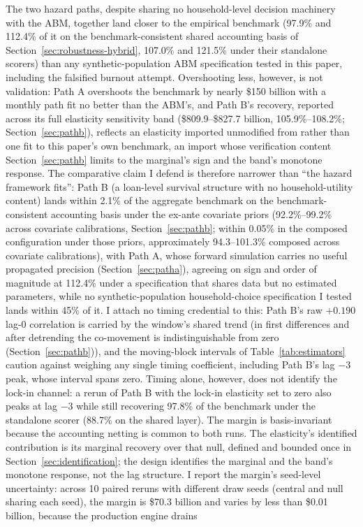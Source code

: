 \documentclass[12pt]{article}
\begin{document}
\begin{table}[H]
\begin{threeparttable}
\begin{tablenotes}[flushleft]
\end{tablenotes}
\end{threeparttable}
\end{table}

The two hazard paths, despite sharing no household-level decision machinery with the ABM, together land closer to the empirical benchmark (97.9\% and 112.4\% of it on the benchmark-consistent shared accounting basis of Section~\ref{sec:robustness-hybrid}, 107.0\% and 121.5\% under their standalone scorers) than any synthetic-population ABM specification tested in this paper, including the falsified burnout attempt. Overshooting less, however, is not validation: Path A overshoots the benchmark by nearly \$150 billion with a monthly path fit no better than the ABM's, and Path B's recovery, reported across its full elasticity sensitivity band (\$809.9--\$827.7 billion, 105.9\%--108.2\%; Section~\ref{sec:pathb}), reflects an elasticity imported unmodified from \citet{liebersohn2024} rather than one fit to this paper's own benchmark, an import whose verification content Section~\ref{sec:pathb} limits to the marginal's sign and the band's monotone response. The comparative claim I defend is therefore narrower than ``the hazard framework fits'': Path B (a loan-level survival structure with no household-utility content) lands within 2.1\% of the aggregate benchmark on the benchmark-consistent accounting basis under the ex-ante covariate priors (92.2\%--99.2\% across covariate calibrations, Section~\ref{sec:pathb}; within 0.05\% in the composed configuration under those priors, approximately 94.3--101.3\% composed across covariate calibrations), with Path A, whose forward simulation carries no useful propagated precision (Section~\ref{sec:patha}), agreeing on sign and order of magnitude at 112.4\% under a specification that shares data but no estimated parameters, while no synthetic-population household-choice specification I tested lands within 45\% of it. I attach no timing credential to this: Path B's raw $+0.190$ lag-0 correlation is carried by the window's shared trend (in first differences and after detrending the co-movement is indistinguishable from zero (Section~\ref{sec:pathb})), and the moving-block intervals of Table~\ref{tab:estimators} caution against weighing any single timing coefficient, including Path B's lag $-3$ peak, whose interval spans zero. Timing alone, however, does not identify the lock-in channel: a rerun of Path B with the lock-in elasticity set to zero also peaks at lag $-3$ while still recovering 97.8\% of the benchmark under the standalone scorer (88.7\% on the shared layer). The margin is basis-invariant because the accounting netting is common to both runs. The elasticity's identified contribution is its marginal recovery over that null, defined and bounded once in Section~\ref{sec:identification}; the design identifies the marginal and the band's monotone response, not the lag structure. I report the margin's seed-level uncertainty: across 10 paired reruns with different draw seeds (central and null sharing each seed), the margin is \$70.3 billion and varies by less than \$0.01 billion, because the production engine drains 
\end{document}
